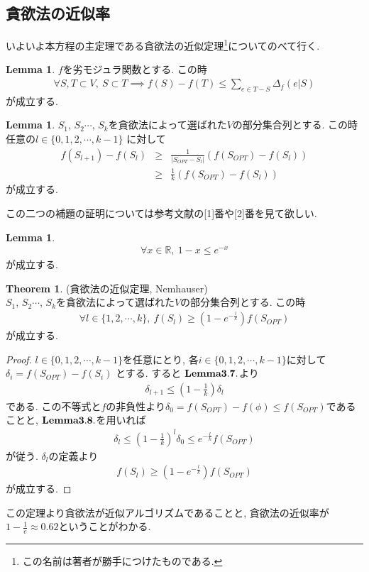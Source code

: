 \documentclass[11pt, a4paper, dvipdfmx]{jsarticle}
\theoremstyle{definition}
\newtheorem{Theorem+}[Axiom+]{Theorem}
\newtheorem{Lemma+}[Axiom+]{Lemma}
\newcommand{\R}{\mathbb{R}}
\begin{document}
\subsection{貪欲法の近似率}
いよいよ本方程の主定理である貪欲法の近似定理\footnote{この名前は著者が勝手につけたものである.}についてのべて行く.
\begin{Lemma+}
    $f$を劣モジュラ関数とする. この時
    \begin{align*}
        \forall S, T\subset V,~ S\subset T\implies f(S) - f(T)\leq \sum_{e\in T - S}\Delta_{f}(e|S)
    \end{align*}
    が成立する.
\end{Lemma+}
\begin{Lemma+}
    $S_{1}$, $S_{2}$$\cdots$, $S_{k}$を貪欲法によって選ばれた$V$の部分集合列とする. この時任意の$l\in\{0, 1, 2, \cdots, k - 1\}$
    に対して 
    \begin{eqnarray*}
          f(S_{l + 1}) -f(S_{l})&\geq& \frac{1}{|S_{OPT} - S_{l}|}(f(S_{OPT}) - f(S_{l})) \\
                                                               &\geq& \frac{1}{k}(f(S_{OPT}) - f(S_{l}))
    \end{eqnarray*}
    が成立する.
\end{Lemma+}
この二つの補題の証明については参考文献の[1]番や[2]番を見て欲しい.
\begin{Lemma+}
    \begin{align*}
        \forall x\in\R, ~1 - x\leq e^{-x}
    \end{align*}
    が成立する.
\end{Lemma+}
\begin{Theorem+}(貪欲法の近似定理, Nemhauser)\\
    $S_{1}$, $S_{2}$$\cdots$, $S_{k}$を貪欲法によって選ばれた$V$の部分集合列とする. この時
    \begin{align*}
        \forall l\in\{1, 2, \cdots, k\}, ~f(S_{l}) \geq\left (1 - e^{-\frac{l}{k}}\right)f(S_{OPT})
    \end{align*}
    が成立する. 
    \begin{proof}
         $l\in\{0, 1, 2, \cdots, k - 1\}$を任意にとり, 各$i\in\{0, 1, 2, \cdots, k - 1\}$に対して$\delta_{i} = f(S_{OPT}) - f(S_{i})$ とする. すると
         ${\bf Lemma 3.7.}$より
        \begin{align*}
            \delta_{l+1}\leq\left(1 - \frac{1}{k}\right)\delta_{l}
        \end{align*}
        である. この不等式と$f$の非負性より$\delta_{0} = f(S_{OPT}) - f(\phi)\leq f(S_{OPT})$であることと, ${\bf Lemma 3.8.}$を用いれば
        \begin{align*}
            \delta_{l}\leq \left(1 - \frac{1}{k}\right)^{l}\delta_{0}\leq e^{-\frac{l}{k}}f(S_{OPT})
        \end{align*}
        が従う. $\delta_{l}$の定義より
        \begin{align*}
            f(S_{l}) \geq\left (1 - e^{-\frac{l}{k}}\right)f(S_{OPT})
        \end{align*}
        が成立する.
    \end{proof}
\end{Theorem+}
この定理より貪欲法が近似アルゴリズムであることと, 貪欲法の近似率が $1 - \frac{1}{e} \approx 0.62$ということがわかる.
\end{document}
